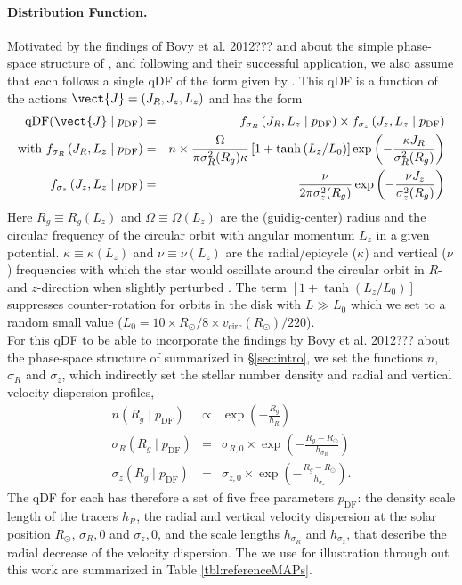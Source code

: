 \paragraph{Distribution Function.} Motivated by the findings of Bovy et al. 2012??? and \citet{tin13} about the simple phase-space structure of \MAPs, and following \citet{bov13} and their successful application, we also assume that each \MAP follows a single qDF of the form given by \citet{bin11}.  This qDF  is a function of the actions $\vect{J}=(J_R,J_z,L_z)$ and has the form
\begin{eqnarray}
\text{qDF}(\vect{J} \mid p_\text{DF}) &=& f_{\sigma_R}\left(J_R,L_z \mid p_\text{DF}\right) \times f_{\sigma_z}\left(J_z,L_z \mid p_\text{DF}\right)\label{eq:df_general}\\
\text{with } f_{\sigma_R}\left(J_R,L_z \mid p_\text{DF}\right) &=& n \times \frac{\Omega}{\pi\sigma_R^2(R_g) \kappa}\left[1+\tanh\left(L_z/L_0\right) \right]\exp\left(-\frac{\kappa J_R}{\sigma_R^2(R_g)} \right) \\
f_{\sigma_z}\left(J_z,L_z \mid p_\text{DF} \right) &=& \frac{\nu}{2 \pi \sigma_z^2(R_g)} \exp\left( -\frac{\nu J_z}{\sigma_z^2(R_g)} \right) \\
\end{eqnarray}
Here $R_g \equiv R_g(L_z)$ and $\Omega\equiv \Omega(L_z)$ are the (guidig-center) radius and the circular frequency of the circular orbit with angular momentum $L_z$ in a given potential. $\kappa\equiv \kappa(L_z)$ and $\nu\equiv \nu(L_z)$ are the radial/epicycle ($\kappa$) and vertical ($\nu$) frequencies with which the star would oscillate around the circular orbit in $R$- and $z$-direction when slightly perturbed \citep{bin08}. The term $\left[1+\tanh\left(L_z/L_0\right) \right]$ suppresses counter-rotation for orbits in the disk with $L \gg L_0$ which we set to a random small value ($L_0 = 10 \times R_\odot/8 \times v_\text{circ}(R_\odot)/220$).
\\For this qDF to be able to incorporate the findings by Bovy et al. 2012??? about the phase-space structure of \MAPs summarized in \S\ref{sec:intro}, we set the functions $n$,  $\sigma_R$ and $\sigma_z$, which indirectly set the stellar number density and radial and vertical velocity dispersion profiles,
\begin{eqnarray}
n(R_g \mid p_\text{DF}) &\propto& \exp\left(-\frac{R_g}{h_R} \right)\\
\sigma_R(R_g \mid p_\text{DF}) &=& \sigma_{R,0} \times \exp\left(- \frac{R_g-R_\odot}{h_{\sigma_R}} \right)\label{eq:sigmaRRg}\\
\sigma_z(R_g \mid p_\text{DF}) &=& \sigma_{z,0} \times \exp\left(- \frac{R_g-R_\odot}{h_{\sigma_z}} \right)\label{eq:sigmazRg}.
\end{eqnarray}
The qDF for each \MAP has therefore a set of five free parameters $p_\text{DF}$: the density scale length of the tracers $h_R$, the radial and vertical velocity dispersion at the solar position $R_\odot$, $\sigma_R,0$ and $\sigma_z,0$, and the scale lengths $h_{\sigma_R}$ and $h_{\sigma_z}$, that describe the radial decrease of the velocity dispersion. The \MAPs we use for illustration through out this work are summarized in Table \ref{tbl:referenceMAPs}.


